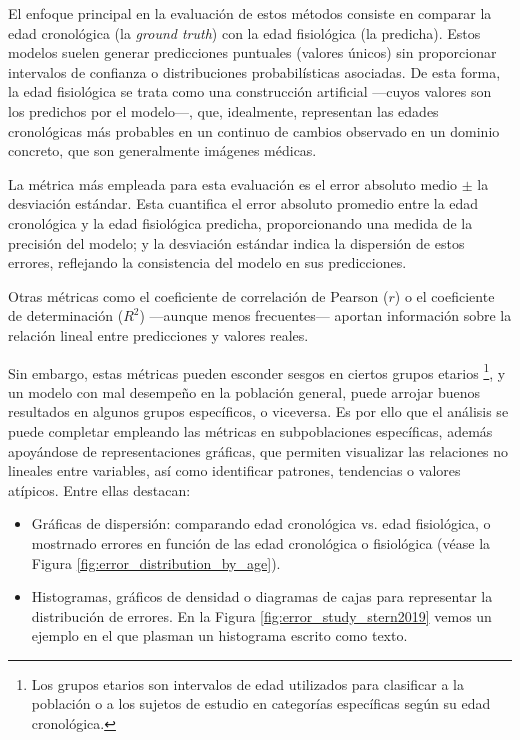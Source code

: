 El enfoque principal en la evaluación de estos métodos consiste en comparar la edad cronológica  
(la \textit{ground truth}) con la edad fisiológica (la predicha). 
Estos modelos suelen generar predicciones puntuales (valores únicos) sin proporcionar intervalos de confianza 
o distribuciones probabilísticas asociadas. 
De esta forma, la edad fisiológica se trata como una construcción artificial ---cuyos valores son los 
predichos por el modelo---, que, idealmente, representan las edades cronológicas más probables
en un continuo de cambios observado en un dominio concreto, que son generalmente imágenes médicas. 

La métrica más empleada para esta evaluación es el error absoluto medio $\pm$ la desviación estándar. 
Esta cuantifica el error absoluto promedio entre la edad cronológica y la edad fisiológica predicha, 
proporcionando una medida de la precisión del modelo; y la desviación estándar indica la dispersión de 
estos errores, reflejando la consistencia del modelo en sus predicciones.

Otras métricas como el coeficiente de correlación de Pearson ($r$) o el coeficiente de determinación ($R^2$) 
---aunque menos frecuentes--- aportan información sobre la relación lineal entre predicciones y 
valores reales.

Sin embargo, estas métricas pueden esconder sesgos en ciertos grupos etarios
\footnote{
    Los grupos etarios son intervalos de edad utilizados para clasificar a la población o a los sujetos de 
    estudio en categorías específicas según su edad cronológica.
}, y un modelo con mal desempeño en la población general, puede arrojar buenos resultados en algunos grupos 
específicos, o viceversa.
Es por ello que el análisis se puede completar empleando las métricas en subpoblaciones específicas, además 
apoyándose de representaciones gráficas, que permiten visualizar las relaciones no lineales entre variables,
así como identificar patrones, tendencias o valores atípicos. Entre ellas destacan: 

\begin{itemize}
    \item Gráficas de dispersión: comparando edad cronológica vs. edad fisiológica, o mostrnado errores en 
    función de las edad cronológica o fisiológica (véase la Figura \ref{fig:error_distribution_by_age}).

    \item Histogramas, gráficos de densidad o diagramas de cajas para representar la distribución de errores.
    En la Figura \ref{fig:error_study_stern2019} vemos un ejemplo en el que plasman un histograma escrito 
    como texto.

\end{itemize}


